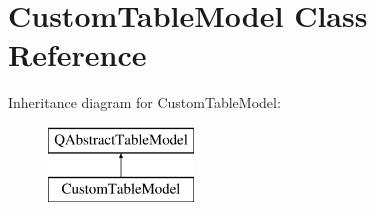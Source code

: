 \hypertarget{class_custom_table_model}{}\section{Custom\+Table\+Model Class Reference}
\label{class_custom_table_model}
Inheritance diagram for Custom\+Table\+Model\+:\begin{figure}[H]
\begin{center}
\leavevmode
\includegraphics[height=2.000000cm]{class_custom_table_model}
\end{center}
\end{figure}
